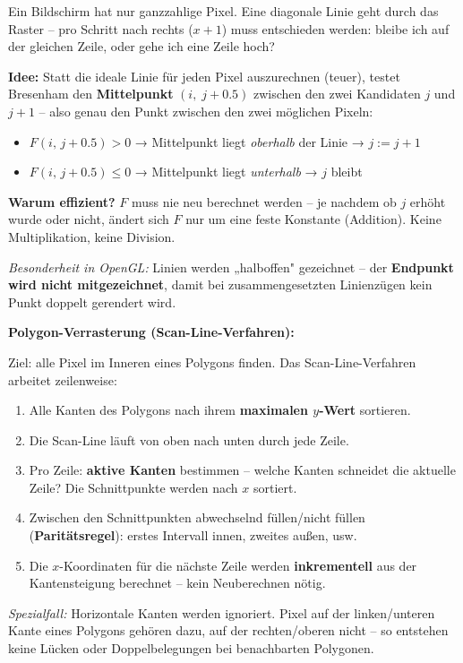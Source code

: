 \documentclass[12pt, a4paper]{article}
\begin{document}
Ein Bildschirm hat nur ganzzahlige Pixel. Eine diagonale Linie geht durch das Raster -- pro Schritt nach rechts ($x+1$) muss entschieden werden: bleibe ich auf der gleichen Zeile, oder gehe ich eine Zeile hoch?

\textbf{Idee:} Statt die ideale Linie für jeden Pixel auszurechnen (teuer), testet Bresenham den \textbf{Mittelpunkt} $(i,\; j+0.5)$ zwischen den zwei Kandidaten $j$ und $j+1$ -- also genau den Punkt zwischen den zwei möglichen Pixeln:
\begin{itemize}
  \item $F(i,\,j+0.5) > 0$ → Mittelpunkt liegt \textit{oberhalb} der Linie → $j := j+1$
  \item $F(i,\,j+0.5) \leq 0$ → Mittelpunkt liegt \textit{unterhalb} → $j$ bleibt
\end{itemize}

\textbf{Warum effizient?} $F$ muss nie neu berechnet werden -- je nachdem ob $j$ erhöht wurde oder nicht, ändert sich $F$ nur um eine feste Konstante (Addition). Keine Multiplikation, keine Division.

\textit{Besonderheit in OpenGL:} Linien werden „halboffen" gezeichnet -- der \textbf{Endpunkt wird nicht mitgezeichnet}, damit bei zusammengesetzten Linienzügen kein Punkt doppelt gerendert wird.

\medskip
\textbf{Polygon-Verrasterung (Scan-Line-Verfahren):}

Ziel: alle Pixel im Inneren eines Polygons finden. Das Scan-Line-Verfahren arbeitet zeilenweise:

\begin{enumerate}
  \item Alle Kanten des Polygons nach ihrem \textbf{maximalen $y$-Wert} sortieren.
  \item Die Scan-Line läuft von oben nach unten durch jede Zeile.
  \item Pro Zeile: \textbf{aktive Kanten} bestimmen -- welche Kanten schneidet die aktuelle Zeile? Die Schnittpunkte werden nach $x$ sortiert.
  \item Zwischen den Schnittpunkten abwechselnd füllen/nicht füllen (\textbf{Paritätsregel}): erstes Intervall innen, zweites außen, usw.
  \item Die $x$-Koordinaten für die nächste Zeile werden \textbf{inkrementell} aus der Kantensteigung berechnet -- kein Neuberechnen nötig.
\end{enumerate}

\textit{Spezialfall:} Horizontale Kanten werden ignoriert. Pixel auf der linken/unteren Kante eines Polygons gehören dazu, auf der rechten/oberen nicht -- so entstehen keine Lücken oder Doppelbelegungen bei benachbarten Polygonen.
\end{document}
